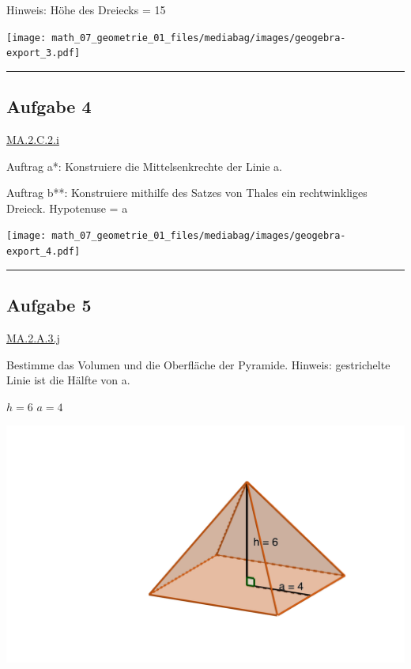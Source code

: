 \documentclass[
  letterpaper,
  DIV=11]{scrartcl}
\begin{document}
Hinweis: Höhe des Dreiecks = 15

\texttt{[image: math\_07\_geometrie\_01\_files/mediabag/images/geogebra-export\_3.pdf]}

\begin{center}\rule{0.5\linewidth}{0.5pt}\end{center}

\subsection{Aufgabe 4}\label{aufgabe-4}

\href{https://be.lehrplan.ch/101AWXeZS2HpzutW5DCGbwzdV7LxLJZWz}{MA.2.C.2.i}

Auftrag a*: Konstruiere die Mittelsenkrechte der Linie a.

Auftrag b**: Konstruiere mithilfe des Satzes von Thales ein
rechtwinkliges Dreieck. Hypotenuse = a

\texttt{[image: math\_07\_geometrie\_01\_files/mediabag/images/geogebra-export\_4.pdf]}

\begin{center}\rule{0.5\linewidth}{0.5pt}\end{center}

\subsection{Aufgabe 5}\label{aufgabe-5}

\href{https://be.lehrplan.ch/101WHZAFydPBVsWSKRxVbDDTJ9S2qrXGZ}{MA.2.A.3.j}

Bestimme das Volumen und die Oberfläche der Pyramide. Hinweis:
gestrichelte Linie ist die Hälfte von a.

\(h = 6\) \(a = 4\)

\includegraphics{images/geogebra-export_5.png}
\end{document}

